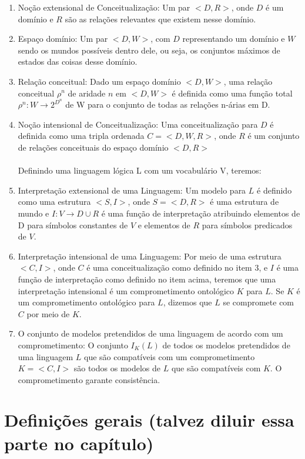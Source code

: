 \begin{enumerate}
	\item Noção extensional de Conceitualização: Um par $<D,R>$, onde $D$ é um domínio e $R$ são as relações relevantes que existem nesse domínio.
	\item Espaço domínio: Um par $<D,W>$, com $ D $ representando um domínio e $ W $ sendo os mundos possíveis dentro dele, ou seja, os conjuntos máximos de estados das coisas desse domínio.
	\item Relação conceitual: Dado um espaço domínio $ <D,W> $, uma relação conceitual $ \rho^n $ de aridade $ n $ em $ <D,W> $ é definida como uma função total $ \rho^n : W \to 2^{D^n}$ de W para o conjunto de todas as relações n-árias em D.
	\item Noção intensional de Conceitualização: Uma conceitualização para $ D $ é definida como uma tripla ordenada $ C=<D,W,R> $, onde $ R $ é um conjunto de relações conceituais do espaço domínio $ <D,R> $ \\ \\
	Definindo uma linguagem lógica L com um vocabulário V, teremos:
	\item Interpretação extensional de uma Linguagem: Um modelo para $ L $ é definido como uma estrutura $ <S,I> $, onde $ S=<D,R> $ é uma estrutura de mundo e $ I : V \to D \cup R $ é uma função de interpretação atribuindo elementos de D para símbolos constantes de $ V $ e elementos de $ R $ para símbolos predicados de $ V $.
	\item Interpretação intensional de uma Linguagem: Por meio de uma estrutura $ <C, I> $, onde $ C $ é uma conceitualização como definido no item 3, e $ I $ é uma função de interpretação como definido no item acima, teremos que uma interpretação intensional é um comprometimento ontológico $ K $ para $ L $. Se $ K $ é um comprometimento ontológico para $ L $, dizemos que $ L $ se compromete com $ C $ por meio de $ K $.
	\item O conjunto de modelos pretendidos de uma linguagem de acordo com um comprometimento: O conjunto $ I_K(L) $ de todos os modelos pretendidos de uma linguagem $ L $ que são compatíveis com um comprometimento $ K = <C,I> $ são todos os modelos de $ L $ que são compatíveis com $ K $. O comprometimento garante consistência.
\end{enumerate}

\section{Definições gerais (talvez diluir essa parte no capítulo)}

